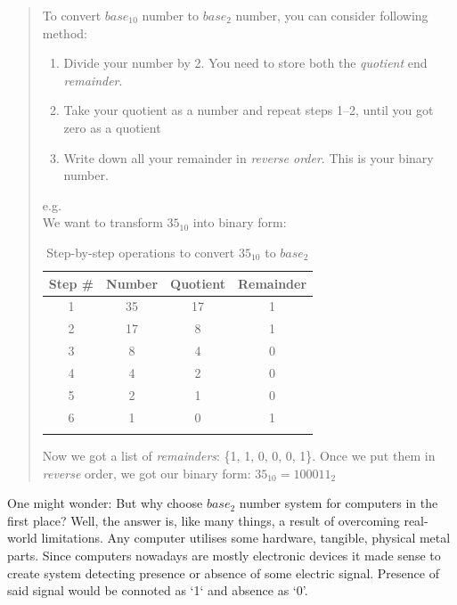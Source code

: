 \documentclass{article}
\begin{document}
            \begin{quote}
                To convert $base_{10}$ number to $base_{2}$ number, you can consider following method:
                \begin{enumerate}
                    \item Divide your number by 2. You need to store both the \emph{quotient} end \emph{remainder}.
                    \item Take your quotient as a number and repeat steps 1--2, until you got zero as a quotient
                    \item Write down all your remainder in \emph{reverse order}. This is your binary number.
                \end{enumerate}

                e.g.\\
                We want to transform $35_{10}$ into binary form:
                \begin{table}[h]
                    \centering                
                    \begin{longtable}{|c|c|c|c|}
                        \hline
                        Step \# & Number & Quotient & Remainder \\\hline
                        1 & 35 & 17 & 1 \\\hline
                        2 & 17 & 8 & 1 \\\hline
                        3 & 8 & 4 & 0 \\\hline
                        4 & 4 & 2 & 0 \\\hline
                        5 & 2 & 1 & 0 \\\hline
                        6 & 1 & 0 & 1 \\\hline
                        \caption{Step-by-step operations to convert $35_{10}$ to $base_2$}

                    \end{longtable}
                \end{table}

                Now we got a list of \emph{remainders}: \{1, 1, 0, 0, 0, 1\}. Once we put them in \emph{reverse} order, we got our binary form: $35_{10} = 100011_2$
            \end{quote}
            
    
            One might wonder: But why choose $base_2$ number system for computers in the first place? Well, the answer is, like many things, a result of overcoming
            real-world limitations. Any computer utilises some hardware, tangible, physical metal parts. Since computers nowadays are mostly electronic devices 
            it made sense to create system detecting presence or absence of some electric signal. Presence of said signal would be connoted as `1` and absence as `0'. \par
\end{document}
